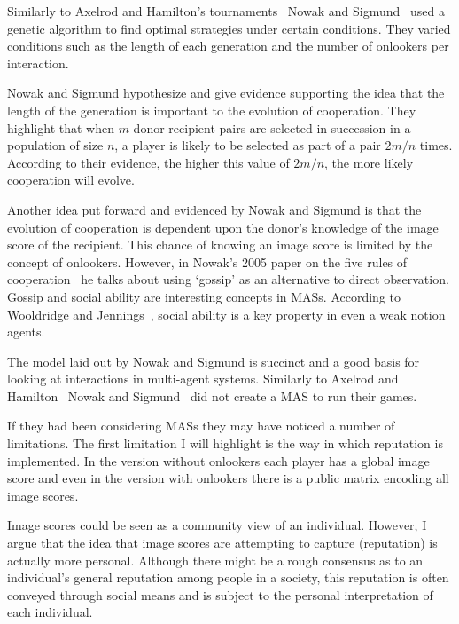 \documentclass[]{final_report}
\begin{document}
Similarly to Axelrod and Hamilton's tournaments~\cite{evolution_of_cooperation} Nowak and Sigmund~\cite{evol_indirect_image} used a genetic algorithm to find optimal strategies under certain conditions. They varied conditions such as the length of each generation and the number of onlookers per interaction.\par 
Nowak and Sigmund hypothesize and give evidence supporting the idea that the length of the generation is important to the evolution of cooperation. They highlight that when $m$ donor-recipient pairs are selected in succession in a population of size $n$, a player is likely to be selected as part of a pair $2m/n$ times. According to their evidence, the higher this value of $2m/n$, the more likely cooperation will evolve.\par
Another idea put forward and evidenced by Nowak and Sigmund is that the evolution of cooperation is dependent upon the donor's knowledge of the image score of the recipient. This chance of knowing an image score is limited by the concept of onlookers. However, in Nowak's 2005 paper on the five rules of cooperation~\cite{five_rules_coop} he talks about using `gossip' as an alternative to direct observation. Gossip and social ability are interesting concepts in MASs. According to Wooldridge and Jennings~\cite{wooldridge_jennings_1995}, social ability is a key property in even a weak notion agents.\par
The model laid out by Nowak and Sigmund is succinct and a good basis for looking at interactions in multi-agent systems. Similarly to Axelrod and Hamilton~\cite{evolution_of_cooperation} Nowak and Sigmund~\cite{evol_indirect_image} did not create a MAS to run their games.\par
If they had been considering MASs they may have noticed a number of limitations. The first limitation I will highlight is the way in which reputation is implemented. In the version without onlookers each player has a global image score and even in the version with onlookers there is a public matrix encoding all image scores.\par
Image scores could be seen as a community view of an individual. However, I argue that the idea that image scores are attempting to capture (reputation) is actually more personal. Although there might be a rough consensus as to an individual's general reputation among people in a society, this reputation is often conveyed through social means and is subject to the personal interpretation of each individual.\par
\end{document}
